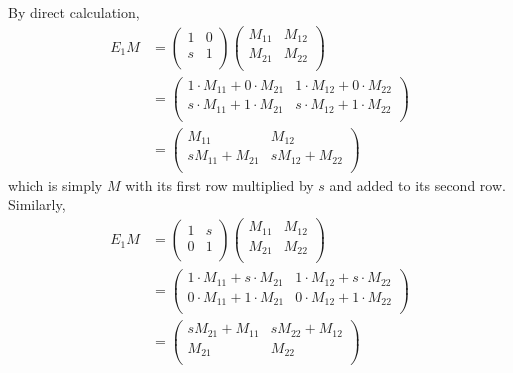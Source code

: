 \documentclass[../group-theory-in-a-nutshell-for-physicists.tex]{subfiles}
\begin{document}
\begin{questions}
\begin{solution}
	By direct calculation,
	\begin{align*}
		E_{1}M &= \begin{pmatrix}
		1 & 0 \\
		s & 1 \\
		\end{pmatrix}\begin{pmatrix}
		M_{11} & M_{12} \\
		M_{21} & M_{22} \\
		\end{pmatrix} \\
		&= \begin{pmatrix}
		1 \cdot M_{11} + 0 \cdot M_{21} & 1 \cdot M_{12} + 0 \cdot M_{22} \\
		s \cdot M_{11} + 1 \cdot M_{21} & s \cdot M_{12} + 1 \cdot M_{22} \\
		\end{pmatrix} \\
		&= \begin{pmatrix}
		M_{11} & M_{12} \\
		sM_{11} + M_{21} & sM_{12} + M_{22} \\
		\end{pmatrix}
	\end{align*}
	which is simply $M$ with its first row multiplied by $s$ and added to its second row. Similarly,
	\begin{align*}
		E_{1}M &= \begin{pmatrix}
		1 & s \\
		0 & 1 \\
		\end{pmatrix}\begin{pmatrix}
		M_{11} & M_{12} \\
		M_{21} & M_{22} \\
		\end{pmatrix} \\
		&= \begin{pmatrix}
		1 \cdot M_{11} + s \cdot M_{21} & 1 \cdot M_{12} + s \cdot M_{22} \\
		0 \cdot M_{11} + 1 \cdot M_{21} & 0 \cdot M_{12} + 1 \cdot M_{22} \\
		\end{pmatrix} \\
		&= \begin{pmatrix}
		sM_{21} + M_{11} & sM_{22} + M_{12} \\
		M_{21} & M_{22} \\
		\end{pmatrix}
	\end{align*}
	

\end{solution}
\end{questions}
\end{document}
